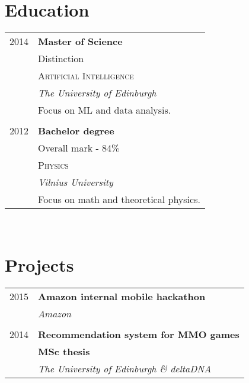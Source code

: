 \documentclass[10pt]{article} %
\begin{document}
{\begin{minipage}[t]{0.44\textwidth}
\vspace{0.5cm}
\section{Education}

\begin{tabular}{rl} %

2014 & \textbf{Master of Science} \\
& \small Distinction\\
& \textsc{Artificial Intelligence} \\
& \textit{The University of Edinburgh} \\
& \small Focus on ML and data analysis. \\
&\\

2012 & \textbf{Bachelor degree}\\
& \small Overall mark - 84\% \\
& \textsc{Physics} \\
& \textit{Vilnius University} \\
& \small Focus on math and theoretical physics. \\


\end{tabular}\\[10pt]


\vspace{0.5cm}
\section{Projects}

\begin{tabular}{rl}

2015     & \textbf{Amazon internal mobile hackathon}\\
& \textit{Amazon}\\
&\\
2014     & \textbf{Recommendation system for MMO games}\\
         & \textbf{MSc thesis}\\
& \textit{The University of Edinburgh \& deltaDNA}\\


\end{tabular}
\end{minipage}}
\end{document}
